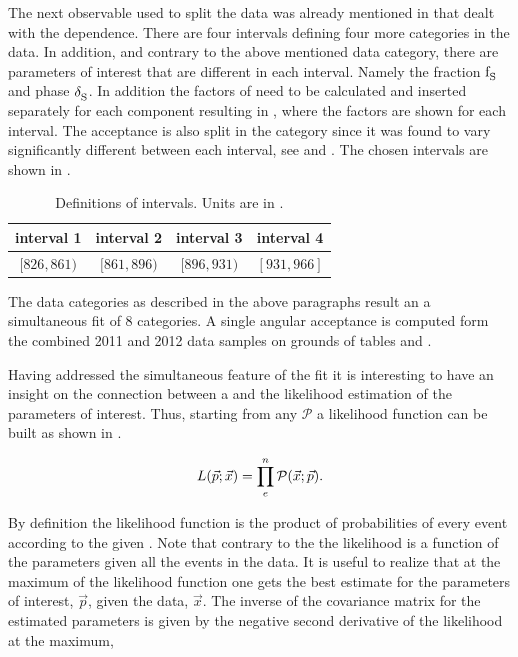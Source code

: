 The next observable used to split the data was already mentioned in  that dealt with the \mkpi dependence.
There are four \mkpi intervals defining four more categories in the data. In addition, and contrary to the above mentioned data category, there
are parameters of interest that are different in each \mkpi interval. Namely the \swave fraction $\text{f}_{\text{S}}^{}$ and phase $\delta_{\text{S}}^{}$.
In addition the \CSP factors of  need to be calculated and inserted separately for each component \pdf resulting in
, where the \CSP factors are shown for each \mkpi interval. The acceptance is also split in the \mkpi category since it was
found to vary significantly different between each \mkpi interval, see  and .
The chosen \mkpi intervals are shown in .

\begin{table}[!h]
\centering
\begin{tabular}{c c c c}
  \hline
  interval 1 & interval 2 & interval 3 & interval 4\\
  \hline
  $ [826,861) $ & $ [861,896) $ & $ [896,931) $ & $ [931,966] $ \\
  \hline
\end{tabular}
\caption{Definitions of \mkpi intervals. Units are in \mevcc.}
\label{Kbindef}
\end{table}

The data categories as described in the above paragraphs result an a simultaneous fit of 8 categories.
A single angular acceptance is computed form the combined 2011 and 2012 data samples on grounds of
tables  and .

Having addressed the simultaneous feature of the fit it is interesting to have an insight on
the connection between a \pdf and the likelihood estimation of the parameters of interest. Thus, starting from
any \pdf $\mathcal{P}$ a likelihood function can be built as shown in .

\begin{equation}
  \centering
L(\vec{p};\vec{x}) = \prod_e^n \mathcal{P}(\vec{x};\vec{p}).
\label{likelihood}
\end{equation}

\noindent By definition the likelihood
function is the product of probabilities of every event according to the given \pdf. Note that contrary to the \pdf
the likelihood is a function of the parameters given all the events in the data. It is
useful to realize that at the maximum of the likelihood function one gets the best estimate for the parameters of
interest, $\vec{p}$, given the data, $\vec{x}$. The inverse of the covariance matrix for the estimated parameters is given
by the negative second derivative of the likelihood at the maximum,


